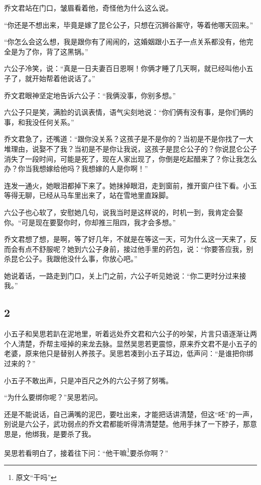 乔文君站在门口，皱眉看着他，奇怪他为什么这么说。

“你还是不想出来，毕竟是嫁了昆仑公子，只想在沉狮谷厮守，等着他哪天回来。”

“你怎么会这么想，我是跟你有了闹闹的，这婚姻跟小五子一点关系都没有，他完全是为了你，背了这黑锅。”

六公子冷笑，说：“真是一日夫妻百日恩啊！你俩才睡了几天啊，就已经叫他小五子了，就开始帮着他说话了。”

乔文君眼神坚定地告诉六公子：“我俩没事，你别多想。”

六公子只是笑，满脸的讥讽表情，语气尖刻地说：“你们俩有没有事，是你们俩的事，和我没任何关系。”

乔文君急了，还嘴道：“跟你没关系？这孩子是不是你的？当初是不是你找了一大堆理由，说娶不了我？当初是不是你让我说，这孩子是昆仑公子的？你说昆仑公子消失了一段时间，可能是死了，现在人家出现了，你倒是吃起醋来了？你让我怎么办？你当我想嫁给他吗？我想嫁的人是你啊！”

连发一通火，她眼泪都掉下来了。她抹掉眼泪，走到窗前，推开窗户往下看。小玉等得无聊，已经从马车里出来了，站在雪地里直跺脚。

六公子也心软了，安慰她几句，说我当时是这样说的，时机一到，我肯定会娶你。“可是现在要娶你时，你却推三阻四，我才会多想。”

乔文君想了想，是啊，等了好几年，不就是在等这一天，可为什么这一天来了，反而会有点不舒服呢？她到六公子身前，接过他手里的药包，说：“你要答应我，别杀昆仑公子。我跟他没什么事，你放心吧。”

她说着话，一路走到门口，关上门之前，六公子听见她说：“你二更时分过来接我。”
\newline

{\centering\subsection{2}}

小五子和吴思若趴在泥地里，听着远处乔文君和六公子的吵架，片言只语逐渐让两个人清楚，乔帮主哑掉的来龙去脉。显然吴思若更震惊，原来乔文君不是小五子的老婆，原来他只是替别人养孩子。吴思若凑到小五子耳边，低声问：“是谁把你绑过来的？”

小五子不敢出声，只是冲百尺之外的六公子努了努嘴。

“为什么要绑你呢？”吴思若问。

还是不能说话，自己满嘴的泥巴，要吐出来，才能把话讲清楚，但这“呸”的一声，别说是六公子，武功弱点的乔文君都能听得清清楚楚。他用手抹了一下脖子，那意思是，他绑我，是要杀了我。

吴思若看明白了，接着往下问：“他干嘛\footnote{原文“干吗”}要杀你啊？”

